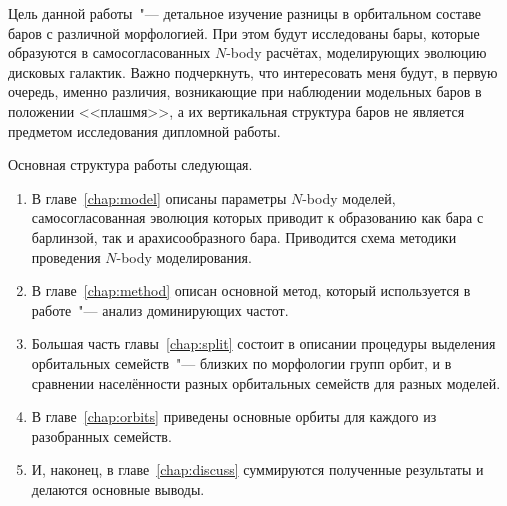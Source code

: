 \documentclass{trlnotes}
\begin{document}
Цель данной работы~"--- детальное изучение разницы в орбитальном составе баров с  различной морфологией. При этом будут исследованы бары,
которые образуются в самосогласованных $N$-body расчётах, моделирующих эволюцию дисковых галактик. Важно подчеркнуть, что интересовать меня
будут, в первую очередь, именно различия, возникающие при наблюдении модельных баров в положении <<плашмя>>, а их вертикальная структура баров
не является предметом исследования дипломной работы. 

Основная структура работы следующая.

\begin{enumerate}
\item В главе~\ref{chap:model} описаны параметры $N$-body моделей, самосогласованная эволюция которых приводит к образованию как бара с
  барлинзой, так и арахисообразного бара. Приводится схема методики проведения $N$-body моделирования.
\item В главе~\ref{chap:method} описан основной метод, который используется в работе~"--- анализ 
доминирующих частот.
\item Большая часть главы~\ref{chap:split} состоит в описании процедуры выделения орбитальных семейств~"---
близких по морфологии групп орбит, и в сравнении населённости разных орбитальных семейств для разных моделей. 
\item В главе~\ref{chap:orbits} приведены основные орбиты для каждого из разобранных семейств.
\item И, наконец, в главе~\ref{chap:discuss} суммируются полученные результаты и делаются основные выводы.
\end{enumerate}
\end{document}
